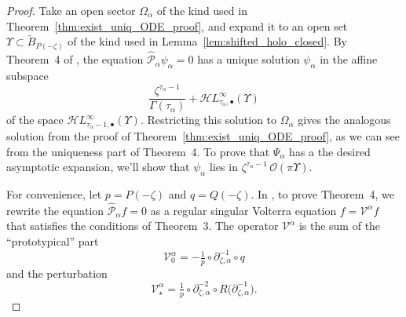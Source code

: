 \documentclass{article}
\newcommand{\singexp}[2]{\mathcal{H}L^\infty_{#1, #2}}
\newcommand{\singexpalg}[1]{\singexp{#1}{\bullet}}
\newcommand{\volterra}{\mathcal{V}}
\newcommand{\hardpart}{\mathcal{V}_0}
\newcommand{\softpart}{\mathcal{V}_\star}
\newcommand{\solwhole}{f}
\theoremstyle{definition}
\theoremstyle{plain}
\begin{document}
\begin{proof}
Take an open sector $\Omega_\alpha$ of the kind used in Theorem~\ref{thm:exist_uniq_ODE_proof}, and expand it to an open set $\Upsilon \subset \widetilde{B}_{P(-\zeta)}$ of the kind used in Lemma~\ref{lem:shifted_holo_closed}. By Theorem~4 of \cite{reg-sing-volterra}, the equation $\hat{\mathcal{P}}_\alpha \psi_\alpha = 0$ has a unique solution $\psi_\alpha$ in the affine subspace
\[ \frac{\zeta^{\tau_\alpha-1}}{\Gamma(\tau_\alpha)} + \singexpalg{\tau_\alpha}(\Upsilon) \]
of the space $\singexpalg{\tau_\alpha-1}(\Upsilon)$. Restricting this solution to $\Omega_\alpha$ gives the analogous solution from the proof of Theorem~\ref{thm:exist_uniq_ODE_proof}, as we can see from the uniqueness part of Theorem~4. To prove that $\Psi_\alpha$ has a the desired asymptotic expansion, we'll show that $\psi_\alpha$ lies in $\zeta^{\tau_\alpha - 1}\,\mathcal{O}(\pi \Upsilon)$.





For convenience, let $p = P(-\zeta)$ and $q = Q(-\zeta)$. In \cite{reg-sing-volterra}, to prove Theorem~4, we rewrite the equation $\hat{\mathcal{P}}_\alpha \solwhole = 0$ as a regular singular Volterra equation $\solwhole = \volterra^\alpha \solwhole$ that satisfies the conditions of Theorem~3. The operator $\volterra^\alpha$ is the sum of the ``prototypical'' part
\[ \hardpart^\alpha = -\tfrac{1}{p} \circ \partial^{-1}_{\zeta, \alpha} \circ q \]
and the perturbation
\[ \softpart^\alpha = \tfrac{1}{p} \circ \partial^{-2}_{\zeta, \alpha} \circ R\big(\partial^{-1}_{\zeta, \alpha}\big). \]


\end{proof}
\end{document}
